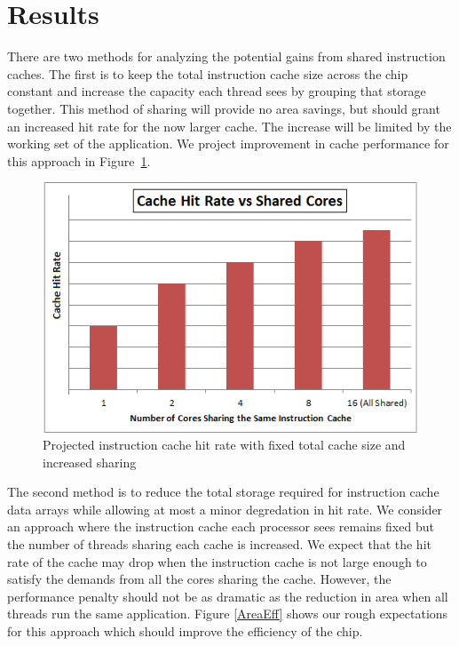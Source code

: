 \section{Results}

There are two methods for analyzing the potential gains from shared
instruction caches.
The first is to keep the total instruction cache size across the chip
constant and increase the capacity each thread sees by grouping that
storage together.
This method of sharing will provide no area savings, but should grant
an increased hit rate for the now larger cache.
The increase will be limited by the working set of the application.
We project improvement in cache performance for this approach in
Figure~\ref{HitImprov}. 

\begin{figure}[b]
\centering
\includegraphics[width=\columnwidth]{graphics/HitRateImprov.png}
\caption{Projected instruction cache hit rate with fixed total cache size and increased sharing}
\label{HitImprov}
\end{figure}

The second method is to reduce the total storage required for
instruction cache data arrays while allowing at most a minor
degredation in hit rate.
We consider an approach where the instruction cache each processor
sees remains fixed but the number of threads sharing each cache is
increased. 
We expect that the hit rate of the cache may drop when the instruction
cache is not large enough to satisfy the demands from all the cores
sharing the cache.
However, the performance penalty should not be as dramatic as the
reduction in area when all threads run the same application.
Figure \ref{AreaEff} shows our rough expectations for this approach
which should improve the efficiency of the chip.

